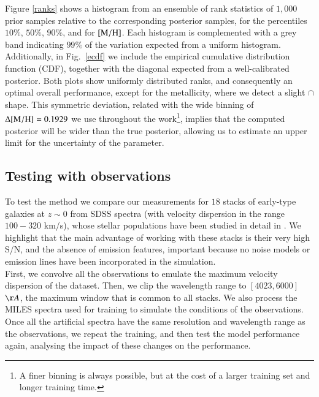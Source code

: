 Figure \ref{ranks} shows a histogram from an ensemble of rank statistics of $1{,}000$ prior samples relative to the corresponding posterior samples,  for the percentiles $10\%$, $50\%$, $90\%$, and for $\rm{[M/H]}$. Each histogram is complemented with a grey band indicating $99\%$ of the variation expected from a uniform histogram. Additionally, in Fig.~\ref{ecdf} we include the empirical cumulative distribution function (CDF), together with the diagonal expected from a well-calibrated posterior. Both plots show uniformly distributed ranks, and consequently an optimal overall performance, except for the metallicity, where we detect a slight $\cap$ shape. This symmetric deviation, related with the wide binning of $\Delta\rm{[M/H]}=0.1929$ we use throughout the work\footnote{A finer binning is always possible, but at the cost of a larger training set and longer training time.}, implies that the computed posterior will be wider than the true posterior, allowing us to estimate an upper limit for the uncertainty of the parameter.






\subsection{Testing with observations}

\label{obs}

To test the method we compare our measurements for $18$  stacks of early-type galaxies at $z \sim 0$ from SDSS spectra (with velocity dispersion in the range $100-320$ km/s), whose stellar populations have been studied in detail in \cite{La_Barbera_2013}. We highlight that the main advantage of working with these stacks is their very high S/N, and the absence of emission features, important because no noise models or emission lines have been incorporated in the simulation.\\

First, we convolve all the observations to emulate the maximum velocity dispersion of the dataset. Then, we clip the wavelength range to $[4023,6000]$ $\AA$, the maximum window that is common to all stacks. We also process the MILES spectra used for training to simulate the conditions of the observations. Once all the artificial spectra have the same resolution and wavelength range as the observations, we repeat the training, and then test the model performance again, analysing the impact of these changes on the performance.\\

